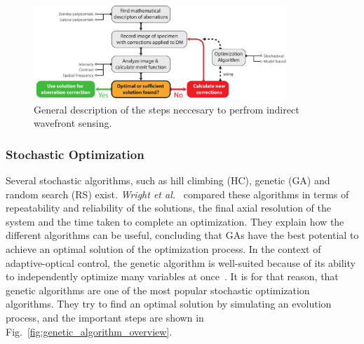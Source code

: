 \begin{figure}[htb]
	\centering
		\includegraphics[width=0.85\textwidth]{images/indirect_wavefront_sensing}
	\caption{General description of the steps neccesary to perfrom indirect wavefront sensing. }
	\label{fig:indirect_wavefront_sensing}
\end{figure}


\subsubsection{Stochastic Optimization}
\label{sec:GeneticAndRandomOptimizationMethods}

Several stochastic algorithms, such as hill climbing (HC), genetic (GA) and random search (RS) exist. \emph{Wright et al.}~\cite{Genetic_compared_to_others} compared these algorithms in terms of repeatability and reliability of the solutions, the final axial resolution of the system and the time taken to complete an optimization. They explain how the different algorithms can be useful, concluding that GAs have the best potential to achieve an optimal solution of the optimization process. In the context of adaptive-optical control, the genetic algorithm is well-suited because of its ability to independently optimize many variables at once~\cite{Genetic_closed_loop}. It is for that reason, that genetic algorithms are one of the most popular stochastic optimization algorithms. They try to find an optimal solution by simulating an evolution process, and the important steps are shown in Fig.~\ref{fig:genetic_algorithm_overview}. 

